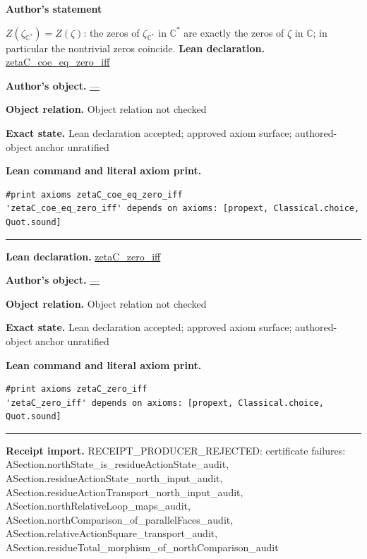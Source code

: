 \documentclass[11pt]{article}
\newcommand{\CC}{\mathbb{C}}
\newcommand{\Cstar}{\CC^{*}}
\newcommand{\zetaC}{\zeta_{\Cstar}}
\theoremstyle{plain}
\theoremstyle{definition}
\theoremstyle{remark}
\begin{document}
\begin{tcolorbox}[provenancecard,title={7. Lemma - Compactification preserves the zero set},title after break={7. Lemma - Compactification preserves the zero set (continued)}]
\textbf{Author's statement}\par
$Z(\zetaC)=Z(\zeta)$: the zeros of $\zetaC$ in $\Cstar$ are exactly the zeros of $\zeta$
in $\CC$; in particular the nontrivial zeros coincide.
\tcblower
\textbf{Lean declaration.} \url{zetaC_coe_eq_zero_iff}
\par\textbf{Author's object.} \url{—}
\par\textbf{Object relation.} Object relation not checked
\par\textbf{Exact state.} Lean declaration accepted; approved axiom surface; authored-object anchor unratified
\par\smallskip\textbf{Lean command and literal axiom print.}
\begin{Verbatim}[breaklines=true,breakanywhere=true,fontsize=\small]
#print axioms zetaC_coe_eq_zero_iff
'zetaC_coe_eq_zero_iff' depends on axioms: [propext, Classical.choice, Quot.sound]
\end{Verbatim}
\medskip\hrule\medskip
\textbf{Lean declaration.} \url{zetaC_zero_iff}
\par\textbf{Author's object.} \url{—}
\par\textbf{Object relation.} Object relation not checked
\par\textbf{Exact state.} Lean declaration accepted; approved axiom surface; authored-object anchor unratified
\par\smallskip\textbf{Lean command and literal axiom print.}
\begin{Verbatim}[breaklines=true,breakanywhere=true,fontsize=\small]
#print axioms zetaC_zero_iff
'zetaC_zero_iff' depends on axioms: [propext, Classical.choice, Quot.sound]
\end{Verbatim}
\medskip\hrule\medskip
\textbf{Receipt import.} \textcolor{KgtRed}{RECEIPT\_PRODUCER\_REJECTED: certificate failures: ASection.northState\_is\_residueActionState\_audit, ASection.residueActionState\_north\_input\_audit, ASection.residueActionTransport\_north\_input\_audit, ASection.northRelativeLoop\_maps\_audit, ASection.northComparison\_of\_parallelFaces\_audit, ASection.relativeActionSquare\_transport\_audit, ASection.residueTotal\_morphism\_of\_northComparison\_audit}
\end{tcolorbox}
\medskip
\end{document}
